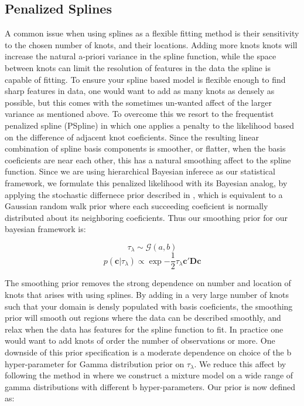 \subsection{Penalized Splines}
A common issue when using splines as a flexible fitting method is their sensitivity to the chosen number of knots, and their locations. 
Adding more knots knots will increase the natural a-priori variance in the spline function, while the space between knots can limit the 
resolution of features in the data the spline is capable of fitting. To ensure your spline based model is flexible enough to find sharp
features in data, one would want to add as many knots as densely as possible, but this comes with the sometimes un-wanted affect of the 
larger variance as mentioned above. To overcome this we resort to the frequentist penalized spline (PSpline) in which one applies a penalty
to the likelihood based on the difference of adjacent knot coeficients. Since the resulting linear combination of spline basis components is 
smoother, or flatter, when the basis coeficients are near each other, this has a natural smoothing affect to the spline function. Since we are 
using hierarchical Bayesian inferece as our statistical framework, we formulate this penalized likelihood with its Bayesian analog, by applying 
the stochastic differnece prior described in , which is equivalent to a Gaussian random walk prior where each succeeding 
coeficient is normally distributed about its neighboring coeficients. Thus our smoothing prior for our bayesian framework is:

\begin{equation}
    \tau_\lambda \sim \mathcal{G}(a, b)
\end{equation}
\begin{equation}
    p(\bm{c} | \tau_\lambda) \propto \exp{-\frac{1}{2} \tau_\lambda \bm{c}' \bm{D} \bm{c}}
\end{equation}

The smoothing prior removes the strong dependence on number and location of knots that arises with using splines. By adding in a 
very large number of knots such that your domain is densly populated with basis coeficients, the smoothing prior will smooth out regions where 
the data can be described smoothly, and relax when the data has features for the spline function to fit. In practice one would want to add knots 
of order the number of observations or more. One downside of this prior specification is a moderate dependence on choice of the b hyper-parameter for 
Gamma distribution prior on $\tau_\lambda$. We reduce this affect by following the method in  where we construct 
a mixture model on a wide range of gamma distributions with different b hyper-parameters. Our prior is now defined as:

